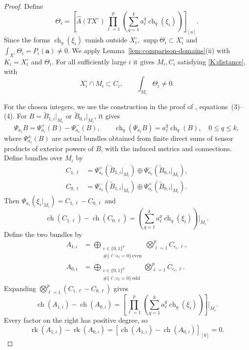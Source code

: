 \documentclass[12pt,reqno]{amsart}
\numberwithin{equation}{section}
\theoremstyle{definition}
\newcommand{\Ahat}{\widehat A}
\newcommand{\ch}{\operatorname{ch}}
\newcommand{\supp}{\operatorname{supp}}
\begin{document}
\begin{proof}
Define
\begin{equation}\label{eq:K-relative-top-form}
 \Theta_i=
 \left[
 \Ahat(TX^\circ)
 \prod_{\ell=1}^p
 \left(\sum_{q=1}^k a_\ell^q\ch_q(\xi_i)\right)
 \right]_{[n]}.
\end{equation}
Since the forms $\ch_q(\xi_i)$ vanish outside $X_i^\circ$,
$\supp\Theta_i\subset X_i^\circ$ and
$\int_{X^\circ}\Theta_i=P_i(\mathbf a)\ne0$.
We apply Lemma~\ref{lem:comparison-domains}\textup{(ii)} with
$K_i=X_i^\circ$ and $\Theta_i$.  For all sufficiently large $i$ it
gives $M_i,C_i$ satisfying \ref{K:distance}, with
\[
 X_i^\circ\cap M_i\subset C_i,\qquad
 \int_{M_i}\Theta_i\ne0.
\]

For the chosen integers, we use the construction in the proof of
\cite[Lemma~5]{BaerHankeKCowaist}, equations~(3)--(4).  For
$B=\widetilde B_{1,i}|_{M_i}$ or $\widetilde B_{0,i}|_{M_i}$, it gives
\[
 \Psi_{a_\ell}B=\Psi_{a_\ell}^+(B)-\Psi_{a_\ell}^-(B),
 \qquad
 \ch_q(\Psi_{a_\ell}B)=a_\ell^q\ch_q(B),
 \quad 0\leq q\leq k,
\]
where $\Psi_{a_\ell}^\pm(B)$ are actual bundles obtained from finite
direct sums of tensor products of exterior powers of $B$, with the
induced metrics and connections.  Define bundles over $M_i$ by
\[
\begin{aligned}
 C_{1,\ell}&=\Psi_{a_\ell}^+(\widetilde B_{1,i}|_{M_i})
            \oplus\Psi_{a_\ell}^-(\widetilde B_{0,i}|_{M_i}),\\
 C_{0,\ell}&=\Psi_{a_\ell}^-(\widetilde B_{1,i}|_{M_i})
            \oplus\Psi_{a_\ell}^+(\widetilde B_{0,i}|_{M_i}).
\end{aligned}
\]
Then $\Psi_{a_\ell}(\xi_i|_{M_i})=C_{1,\ell}-C_{0,\ell}$ and
\[
 \ch(C_{1,\ell})-\ch(C_{0,\ell})
 =\left(\sum_{q=1}^k a_\ell^q\ch_q(\xi_i)\right)\Big|_{M_i}.
\]
Define the two bundles by
\[
\begin{aligned}
 A_{1,i}
 &=\bigoplus_{\substack{\epsilon\in\{0,1\}^p\\
              \#\{\ell:\epsilon_\ell=0\}\ \mathrm{even}}}
      \bigotimes_{\ell=1}^p C_{\epsilon_\ell,\ell},\\
 A_{0,i}
 &=\bigoplus_{\substack{\epsilon\in\{0,1\}^p\\
              \#\{\ell:\epsilon_\ell=0\}\ \mathrm{odd}}}
      \bigotimes_{\ell=1}^p C_{\epsilon_\ell,\ell}.
\end{aligned}
\]
Expanding $\bigotimes_{\ell=1}^p(C_{1,\ell}-C_{0,\ell})$ gives
\[
 \ch(A_{1,i})-\ch(A_{0,i})
 =\left[
 \prod_{\ell=1}^p
 \left(\sum_{q=1}^k a_\ell^q\ch_q(\xi_i)\right)
 \right]\Big|_{M_i}.
\]
Every factor on the right has positive degree, so
\[
 \operatorname{rk}(A_{1,i})-\operatorname{rk}(A_{0,i})
 =[\ch(A_{1,i})-\ch(A_{0,i})]_{[0]}=0.
\]


\end{proof}
\end{document}
